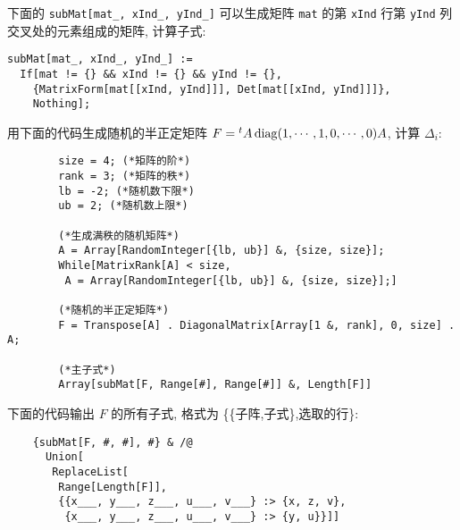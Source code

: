 \documentclass[color=black,device=normal,lang=cn,mode=geye]{elegantnote}
\begin{document}
\begin{note}
    下面的 \verb|subMat[mat_, xInd_, yInd_]| 可以生成矩阵 \verb|mat| 的第 \verb|xInd| 行第 \verb|yInd| 列交叉处的元素组成的矩阵, 计算子式:
    \begin{lstlisting}
subMat[mat_, xInd_, yInd_] := 
  If[mat != {} && xInd != {} && yInd != {},
    {MatrixForm[mat[[xInd, yInd]]], Det[mat[[xInd, yInd]]]},
    Nothing];
    \end{lstlisting}
    
    用下面的代码生成随机的半正定矩阵 $F={}^tA\operatorname{diag}(1,\cdots,1,0,\cdots,0)A$, 计算 $\Delta_i$:
    \begin{lstlisting}
        size = 4; (*矩阵的阶*)
        rank = 3; (*矩阵的秩*)
        lb = -2; (*随机数下限*)
        ub = 2; (*随机数上限*)

        (*生成满秩的随机矩阵*)
        A = Array[RandomInteger[{lb, ub}] &, {size, size}];
        While[MatrixRank[A] < size, 
         A = Array[RandomInteger[{lb, ub}] &, {size, size}];]

        (*随机的半正定矩阵*)
        F = Transpose[A] . DiagonalMatrix[Array[1 &, rank], 0, size] . A;

        (*主子式*)
        Array[subMat[F, Range[#], Range[#]] &, Length[F]]
    \end{lstlisting}

    下面的代码输出 $F$ 的所有子式, 格式为 \{\{子阵,子式\},选取的行\}:
    \begin{lstlisting}
    {subMat[F, #, #], #} & /@
      Union[
       ReplaceList[
        Range[Length[F]],
        {{x___, y___, z___, u___, v___} :> {x, z, v},
         {x___, y___, z___, u___, v___} :> {y, u}}]]
    \end{lstlisting}
\end{note}
\end{document}
